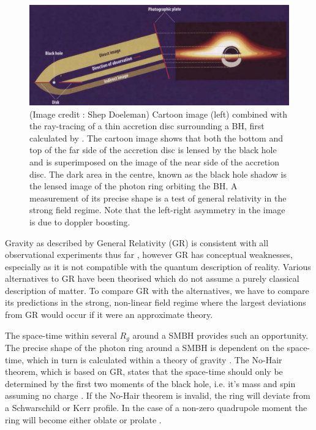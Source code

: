 \begin{figure}[h!]
\includegraphics[width=\columnwidth]{Images/lensed_cartoon}
\caption[Cartoon image (left) combined with the ray-tracing of a thin accretion disc surrounding a BH, first calculated by \citet{Luminet_1979}.  The dark area in the centre, known as the black hole shadow is the lensed image of the photon ring orbiting the BH.]{(Image credit : Shep Doeleman) Cartoon image (left) combined with the ray-tracing of a thin accretion disc surrounding a BH, first calculated by \citet{Luminet_1979}. The cartoon image shows that both the bottom and top of the far side of the accretion disc is lensed by the black hole and is superimposed on the image of the near side of the accretion disc. The dark area in the centre, known as the black hole shadow is the lensed image of the photon ring orbiting the BH. A measurement of its precise shape is a test of general relativity in the strong field regime. Note that the left-right asymmetry in the image is due to doppler boosting. \label{fig:grmhd}%
}
\end{figure}


Gravity as described by General Relativity (GR) is consistent with all observational experiments thus far \citep[e.g.][and references therein]{Kramer_2006}, however GR has conceptual weaknesses, especially as it is not compatible with the quantum description of reality. Various alternatives to GR have been theorised which do not assume a purely classical description of matter. To compare GR with the alternatives, we have to compare its predictions in the strong, non-linear field regime where the largest deviations from GR would occur if it were an approximate theory.


The space-time within several $R_g$ around a SMBH provides such an opportunity. The precise shape of the photon ring around a SMBH is dependent on the space-time, which in turn is calculated within a theory of gravity \citep{Takahashi_2004}. The No-Hair theorem, which is based on GR, states that the space-time should only be determined by the first two moments of the black hole, i.e. it's mass and spin assuming no charge \citep[][and references therein]{Hawking_1972}. If the No-Hair theorem is invalid, the ring will deviate from a Schwarschild or Kerr profile. In the case of a non-zero quadrupole moment the ring will become either oblate or prolate \citep[e.g.][]{Johannsen_2010}. 

